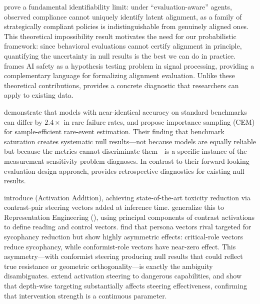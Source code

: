\citet{santos2026limits} prove a fundamental identifiability limit: under
``evaluation-aware'' agents, observed compliance cannot uniquely identify latent
alignment, as a family of strategically compliant policies is indistinguishable from
genuinely aligned ones. This theoretical impossibility result motivates the need for
our probabilistic framework: since behavioral evaluations cannot certify alignment
in principle, quantifying the uncertainty in null results is the best we can do in
practice. \citet{chen2025computational} frames AI safety as a hypothesis testing
problem in signal processing, providing a complementary language for formalizing
alignment evaluation. Unlike these theoretical contributions, \ours provides a
concrete diagnostic that researchers can apply to existing data.

\citet{kim2026fivnines} demonstrate that models with near-identical accuracy on
standard benchmarks can differ by $2.4\times$ in rare failure rates, and propose
importance sampling (CEM) for sample-efficient rare-event estimation. Their finding
that benchmark saturation creates systematic null results---not because models are
equally reliable but because the metrics cannot discriminate them---is a specific
instance of the measurement sensitivity problem \ours diagnoses. In contrast to
their forward-looking evaluation design approach, \ours provides retrospective
diagnostics for existing null results.

\citet{turner2023actadd} introduce \actadd (Activation Addition), achieving
state-of-the-art toxicity reduction via contrast-pair steering vectors added at
inference time. \citet{zou2023repe} generalize this to Representation Engineering
(\repe), using principal components of contrast activations to define reading and
control vectors. \citet{kelkar2026persona} find that persona vectors rival targeted
\caa for sycophancy reduction but show highly asymmetric effects: critical-role
vectors reduce sycophancy, while conformist-role vectors have near-zero effect. This
asymmetry---with conformist steering producing null results that could reflect true
resistance or geometric orthogonality---is exactly the ambiguity \ours disambiguates.
\citet{leech2024extend} extend activation steering to dangerous capabilities, and
\citet{huang2025depth} show that depth-wise targeting substantially affects steering
effectiveness, confirming that intervention strength is a continuous parameter.

